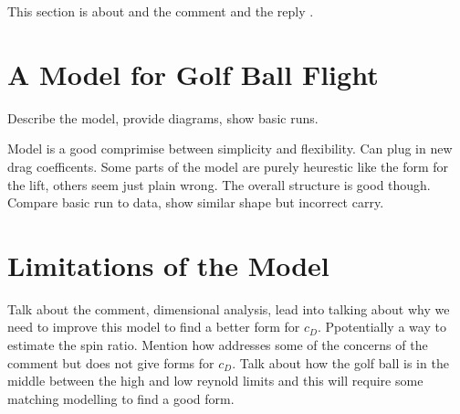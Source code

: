 This section is about \citet{Robinson2013} and the comment \citet{Jensen2014Comment} and the 
reply \citet{Robinson2014Reply}.

\section{A Model for Golf Ball Flight}

Describe the model, provide diagrams, show basic runs.

Model is a good comprimise between simplicity and flexibility. Can plug in new drag coefficents.
Some parts of the model are purely heurestic like the form for the lift, others seem just plain wrong.
The overall structure is good though. Compare basic run to data, show similar shape but incorrect
carry.

\section{Limitations of the Model}

Talk about the \citet{Jensen2014Comment} comment, dimensional analysis, lead into talking about why
we need to improve this model to find a better form for $c_{D}$. Ppotentially a way to estimate the 
spin ratio. Mention how \citet{Robinson2014Reply} addresses some of the concerns of the comment but does
not give forms for $c_{D}$. Talk about how the golf ball is in the middle between the high and low
reynold limits and this will require some matching modelling to find a good form.